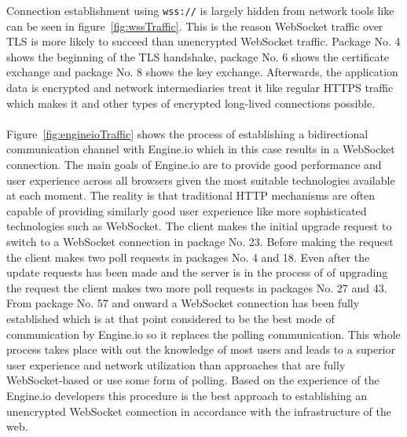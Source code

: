 \noindent
Connection establishment using \texttt{wss://} is largely hidden from network tools like can be seen in figure~\ref{fig:wssTraffic}. This is the reason WebSocket traffic over TLS is more likely to succeed than unencrypted WebSocket traffic. Package No. 4 shows the beginning of the TLS handshake, package No. 6 shows the certificate exchange and package No. 8 shows the key exchange. Afterwards, the application data is encrypted and network intermediaries treat it like regular HTTPS traffic which makes it and other types of encrypted long-lived connections possible.
\\ \\
Figure~\ref{fig:engineioTraffic} shows the process of establishing a bidirectional communication channel with Engine.io which in this case results in a WebSocket connection. The main goals of Engine.io are to provide good performance and user experience across all browsers given the most suitable technologies available at each moment. The reality is that traditional HTTP mechanisms are often capable of providing similarly good user experience like more sophisticated technologies such as WebSocket. The client makes the initial upgrade request to switch to a WebSocket connection in package No. 23. Before making the request the client makes two poll requests in packages No. 4 and 18. Even after the update requests has been made and the server is in the process of of upgrading the request the client makes two more poll requests in packages No. 27 and 43. From package No. 57 and onward a WebSocket connection has been fully established which is at that point considered to be the best mode of communication by Engine.io so it replaces the polling communication. This whole process takes place with out the knowledge of most users and leads to a superior user experience and network utilization than approaches that are fully WebSocket-based or use some form of polling. Based on the experience of the Engine.io developers this procedure is the best approach to establishing an unencrypted WebSocket connection in accordance with the infrastructure of the web.

